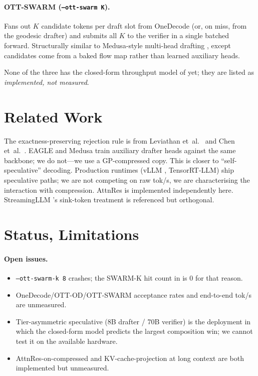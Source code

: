 \documentclass[11pt]{article}
\begin{document}
\paragraph{OTT-SWARM (\texttt{--ott-swarm K}).}  Fans out $K$ candidate
tokens per draft slot from OneDecode (or, on miss, from the geodesic
drafter) and submits all $K$ to the verifier in a single batched forward.
Structurally similar to Medusa-style multi-head drafting
\cite{cai2024medusa}, except candidates come from a baked flow map
rather than learned auxiliary heads.

\noindent
None of the three has the closed-form throughput model of
 yet; they are listed as
\emph{implemented, not measured}.

\section{Related Work}
The exactness-preserving rejection rule is from Leviathan et~al.\
\cite{leviathan2023speculative} and Chen et~al.\ \cite{chen2023speculative}.
EAGLE \cite{li2024eagle} and Medusa \cite{cai2024medusa} train auxiliary
drafter heads against the same backbone; we do not---we use a
GP-compressed copy.  This is closer to ``self-speculative''
decoding.  Production runtimes (vLLM \cite{kwon2023vllm}, TensorRT-LLM)
ship speculative paths; we are not competing on raw tok/s, we are
characterising the interaction with compression.  AttnRes is implemented
independently here.  StreamingLLM \cite{xiao2023streamingllm}'s sink-token
treatment is referenced but orthogonal.

\section{Status, Limitations}
\label{sec:status}
\paragraph{Open issues.}
\begin{itemize}
\item \texttt{--ott-swarm-k 8} crashes; the SWARM-K hit count in
\Cref{tab:measured} is $0$ for that reason.
\item OneDecode/OTT-OD/OTT-SWARM acceptance rates and end-to-end tok/s
are unmeasured.
\item Tier-asymmetric speculative (8B drafter / 70B verifier) is the
deployment in which the closed-form model predicts the largest
composition win; we cannot test it on the available hardware.
\item AttnRes-on-compressed and KV-cache-projection at long context are
both implemented but unmeasured.
\end{itemize}
\end{document}
